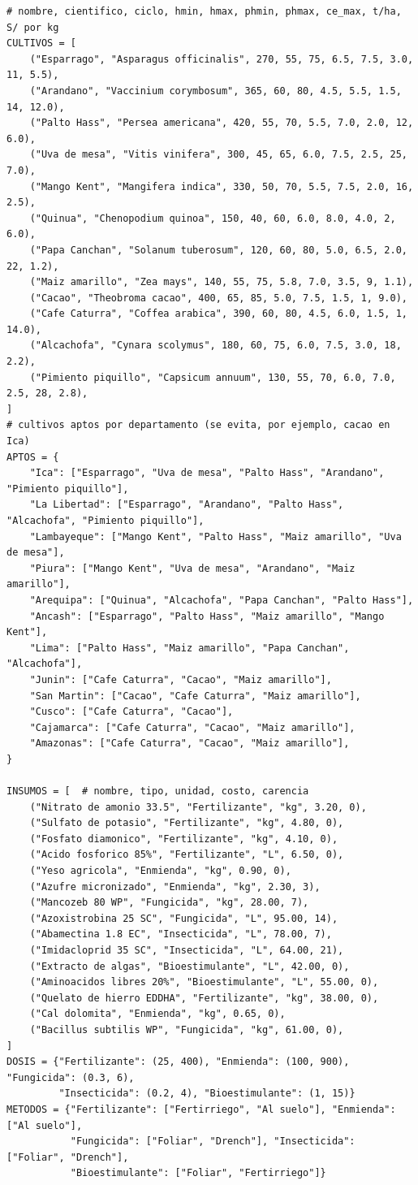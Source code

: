 \documentclass[11pt,letterpaper]{article}
\begin{document}
\begin{lstlisting}[style=py]
# nombre, cientifico, ciclo, hmin, hmax, phmin, phmax, ce_max, t/ha, S/ por kg
CULTIVOS = [
    ("Esparrago", "Asparagus officinalis", 270, 55, 75, 6.5, 7.5, 3.0, 11, 5.5),
    ("Arandano", "Vaccinium corymbosum", 365, 60, 80, 4.5, 5.5, 1.5, 14, 12.0),
    ("Palto Hass", "Persea americana", 420, 55, 70, 5.5, 7.0, 2.0, 12, 6.0),
    ("Uva de mesa", "Vitis vinifera", 300, 45, 65, 6.0, 7.5, 2.5, 25, 7.0),
    ("Mango Kent", "Mangifera indica", 330, 50, 70, 5.5, 7.5, 2.0, 16, 2.5),
    ("Quinua", "Chenopodium quinoa", 150, 40, 60, 6.0, 8.0, 4.0, 2, 6.0),
    ("Papa Canchan", "Solanum tuberosum", 120, 60, 80, 5.0, 6.5, 2.0, 22, 1.2),
    ("Maiz amarillo", "Zea mays", 140, 55, 75, 5.8, 7.0, 3.5, 9, 1.1),
    ("Cacao", "Theobroma cacao", 400, 65, 85, 5.0, 7.5, 1.5, 1, 9.0),
    ("Cafe Caturra", "Coffea arabica", 390, 60, 80, 4.5, 6.0, 1.5, 1, 14.0),
    ("Alcachofa", "Cynara scolymus", 180, 60, 75, 6.0, 7.5, 3.0, 18, 2.2),
    ("Pimiento piquillo", "Capsicum annuum", 130, 55, 70, 6.0, 7.0, 2.5, 28, 2.8),
]
# cultivos aptos por departamento (se evita, por ejemplo, cacao en Ica)
APTOS = {
    "Ica": ["Esparrago", "Uva de mesa", "Palto Hass", "Arandano", "Pimiento piquillo"],
    "La Libertad": ["Esparrago", "Arandano", "Palto Hass", "Alcachofa", "Pimiento piquillo"],
    "Lambayeque": ["Mango Kent", "Palto Hass", "Maiz amarillo", "Uva de mesa"],
    "Piura": ["Mango Kent", "Uva de mesa", "Arandano", "Maiz amarillo"],
    "Arequipa": ["Quinua", "Alcachofa", "Papa Canchan", "Palto Hass"],
    "Ancash": ["Esparrago", "Palto Hass", "Maiz amarillo", "Mango Kent"],
    "Lima": ["Palto Hass", "Maiz amarillo", "Papa Canchan", "Alcachofa"],
    "Junin": ["Cafe Caturra", "Cacao", "Maiz amarillo"],
    "San Martin": ["Cacao", "Cafe Caturra", "Maiz amarillo"],
    "Cusco": ["Cafe Caturra", "Cacao"],
    "Cajamarca": ["Cafe Caturra", "Cacao", "Maiz amarillo"],
    "Amazonas": ["Cafe Caturra", "Cacao", "Maiz amarillo"],
}

INSUMOS = [  # nombre, tipo, unidad, costo, carencia
    ("Nitrato de amonio 33.5", "Fertilizante", "kg", 3.20, 0),
    ("Sulfato de potasio", "Fertilizante", "kg", 4.80, 0),
    ("Fosfato diamonico", "Fertilizante", "kg", 4.10, 0),
    ("Acido fosforico 85%", "Fertilizante", "L", 6.50, 0),
    ("Yeso agricola", "Enmienda", "kg", 0.90, 0),
    ("Azufre micronizado", "Enmienda", "kg", 2.30, 3),
    ("Mancozeb 80 WP", "Fungicida", "kg", 28.00, 7),
    ("Azoxistrobina 25 SC", "Fungicida", "L", 95.00, 14),
    ("Abamectina 1.8 EC", "Insecticida", "L", 78.00, 7),
    ("Imidacloprid 35 SC", "Insecticida", "L", 64.00, 21),
    ("Extracto de algas", "Bioestimulante", "L", 42.00, 0),
    ("Aminoacidos libres 20%", "Bioestimulante", "L", 55.00, 0),
    ("Quelato de hierro EDDHA", "Fertilizante", "kg", 38.00, 0),
    ("Cal dolomita", "Enmienda", "kg", 0.65, 0),
    ("Bacillus subtilis WP", "Fungicida", "kg", 61.00, 0),
]
DOSIS = {"Fertilizante": (25, 400), "Enmienda": (100, 900), "Fungicida": (0.3, 6),
         "Insecticida": (0.2, 4), "Bioestimulante": (1, 15)}
METODOS = {"Fertilizante": ["Fertirriego", "Al suelo"], "Enmienda": ["Al suelo"],
           "Fungicida": ["Foliar", "Drench"], "Insecticida": ["Foliar", "Drench"],
           "Bioestimulante": ["Foliar", "Fertirriego"]}


\end{lstlisting}
\end{document}
